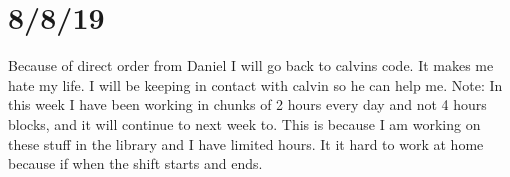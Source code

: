 \documentclass{article}
\begin{document}
\section{8/8/19}
Because of direct order from Daniel I will go back to calvins code. It makes me hate my life. I will be keeping in contact with calvin so he can help me. Note: In this week I have been working in chunks of 2 hours every day and not 4 hours blocks, and it will continue to next week to. This is because I am working on these stuff in the library and I have limited hours. It it hard to work at home because if when the shift starts and ends.
\end{document}
